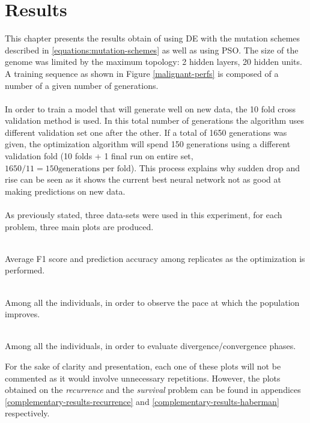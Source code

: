 \documentclass[a4paper,12pt, oneside]{memoir}
\begin{document}
\chapter{Results}

This chapter presents the results obtain of using DE with the mutation schemes described in \ref{equations:mutation-schemes} as well as using PSO. The size of the genome was limited by the maximum topology: 2 hidden layers, 20 hidden units. A training sequence as shown in Figure \ref{malignant-perfs} is composed of a number of a given number of generations. 
\\ \\
In order to train a model that will generate well on new data, the 10 fold cross validation method is used. In this total number of generations the algorithm uses different validation set one after the other. If a total of 1650 generations was given, the optimization algorithm will spend 150 generations using a different validation fold (10 folds + 1 final run on entire set, $1650/11=150\text{generations per fold}$). This process explains why sudden drop and rise can be seen as it shows the current best neural network not as good at making predictions on new data.
\\ \\
As previously stated, three data-sets were used in this experiment, for each problem, three main plots are produced.
\begin{description}
  \setlength\itemsep{0.001em}
  \item [General performance plots] \hfill \\
  Average F1 score and prediction accuracy among replicates as the optimization is performed.
  \item [Mean of the fitness values] \hfill \\
  Among all the individuals, in order to observe the pace at which the population improves.
  \item [Variance of the fitness values] \hfill \\
  Among all the individuals, in order to evaluate divergence/convergence phases.
\end{description}
For the sake of clarity and presentation, each one of these plots will not be commented as it would involve unnecessary repetitions. However, the plots obtained on the \textit{recurrence} and the \textit{survival} problem can be found in appendices \ref{complementary-results-recurrence} and \ref{complementary-results-haberman} respectively.
\end{document}
